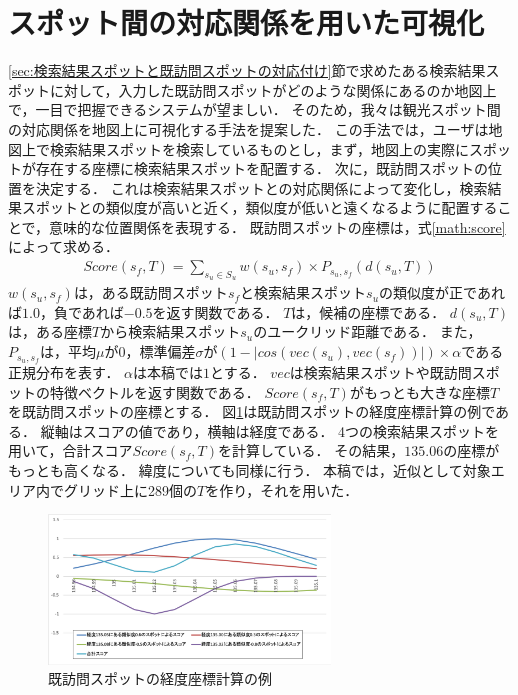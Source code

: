 \documentclass{deimj}
\begin{document}
\section{スポット間の対応関係を用いた可視化}
\label{sec:検索結果スポットと既訪問スポットの対応関係を用いた可視化}
\ref{sec:検索結果スポットと既訪問スポットの対応付け}節で求めたある検索結果スポットに対して，入力した既訪問スポットがどのような関係にあるのか地図上で，一目で把握できるシステムが望ましい．
そのため，我々は観光スポット間の対応関係を地図上に可視化する手法\cite{潘STI}を提案した．
この手法では，ユーザは地図上で検索結果スポットを検索しているものとし，まず，地図上の実際にスポットが存在する座標に検索結果スポットを配置する．
次に，既訪問スポットの位置を決定する．
これは検索結果スポットとの対応関係によって変化し，検索結果スポットとの類似度が高いと近く，類似度が低いと遠くなるように配置することで，意味的な位置関係を表現する．
既訪問スポットの座標は，式\ref{math:score}によって求める．
\begin{eqnarray}
Score(s_f,T) = \sum_{s_u \in S_u}^{} w(s_u,s_f) \times P_{s_u,s_f}(d(s_u,T))
    \label{math:score}
\end{eqnarray}
$w(s_u,s_f)$は，ある既訪問スポット$s_f$と検索結果スポット$s_u$の類似度が正であれば$1.0$，負であれば$-0.5$を返す関数である．
$T$は，候補の座標である．
$d(s_u,T)$は，ある座標$T$から検索結果スポット$s_u$のユークリッド距離である．
また，$P_{s_u,s_f}$は，平均$\mu$が$0$，標準偏差$\sigma$が$(1-|cos(vec(s_u),vec(s_f))|) \times \alpha$である正規分布を表す．
$\alpha$は本稿では$1$とする．
$vec$は検索結果スポットや既訪問スポットの特徴ベクトルを返す関数である．
$Score(s_f,T)$がもっとも大きな座標$T$を既訪問スポットの座標とする．
図\ref{fig:latlng}は既訪問スポットの経度座標計算の例である．
縦軸はスコアの値であり，横軸は経度である．
4つの検索結果スポットを用いて，合計スコア$Score(s_f,T)$を計算している．
その結果，$135.06$の座標がもっとも高くなる．
緯度についても同様に行う．
本稿では，近似として対象エリア内でグリッド上に289個の$T$を作り，それを用いた．
\begin{figure}[t]
  \begin{center}
    \includegraphics[clip,width=7.5cm]{picture/score_image2.png}
    \caption{既訪問スポットの経度座標計算の例}
    \label{fig:latlng}
  \end{center}
\end{figure}
\end{document}
